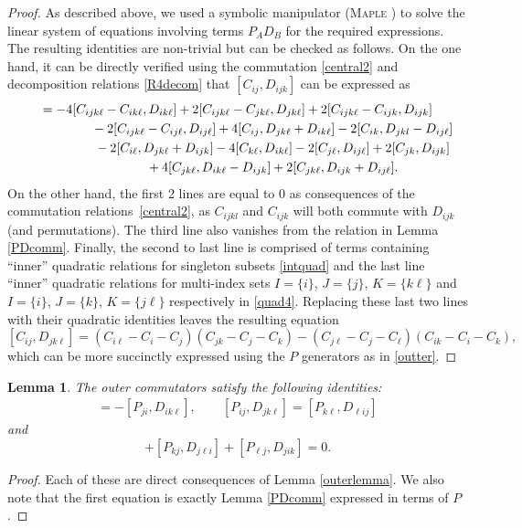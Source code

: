 \documentclass[pdftex]{sigma}
\numberwithin{equation}{section}
\newtheorem{Lemma}[Theorem]{Lemma}
\begin{document}
\begin{proof} As described above, we used a symbolic manipulator (\textsc{Maple} \cite{Maple}) to solve the linear system of equations involving terms $P_{A} D_B$ for the required expressions. The resulting identities are non-trivial but can be checked as follows. On the one hand, it can be directly verified using the commutation \eqref{central2} and decomposition relations \eqref{R4decom} that $[C_{ij}, D_{ijk}]$ can be expressed as
\begin{gather*}
[C_{ij},D_{jkl}]= - 4[C_{ijk\ell}-C_{ik\ell}, D_{ik\ell}]+2[C_{ijk\ell}-C_{jk\ell}, D_{jk\ell}]
+2[C_{ijk\ell}-C_{ijk}, D_{ijk}] \\
\hphantom{[C_{ij},D_{jkl}]=}{}- 2[C_{ijk\ell}-C_{ij\ell}, D_{ij\ell}]+4[C_{ij}, D_{jk\ell}+D_{ik\ell}]- 2[C_{ik},D_{jkl}-D_{ij\ell}]
\\
\hphantom{[C_{ij},D_{jkl}]=}{}- 2[C_{i\ell}, D_{jk\ell}+D_{ijk}]
-4 [C_{k\ell}, D_{ik\ell}]-2 [C_{j\ell}, D_{ij\ell}]
+2[C_{jk}, D_{ijk}]\\
\hphantom{[C_{ij},D_{jkl}]=}{}+4[C_{jk\ell}, D_{ik\ell}-D_{ijk}]+2[C_{jk\ell}, D_{ijk}+D_{ij\ell}].
\end{gather*}
 On the other hand, the first 2 lines are equal to 0 as consequences of the commutation relations~\eqref{central2}, as $C_{ijkl}$ and $C_{ijk}$ will both commute with $D_{ijk}$ (and permutations). The third line also vanishes from the relation in Lemma \ref{PDcomm}. Finally, the second to last line is comprised of terms containing ``inner'' quadratic relations for singleton subsets \eqref{intquad} and the last line ``inner'' quadratic relations for multi-index sets $I=\{i\}$, $J=\{j\}$, $K=\{k\ell\}$ and $I=\{i\}$, $J=\{k\}$, $ K=\{j\ell\}$ respectively in \eqref{quad4}. Replacing these last two lines with their quadratic identities leaves the resulting equation
 \[ [C_{ij}, D_{jk\ell}] =(C_{i\ell}- C_i -C_j) (C_{jk}-C_j-C_k)-(C_{j\ell}-C_j-C_{\ell})(C_{ik}-C_i-C_k),\]
which can be more succinctly expressed using the $P$ generators as in \eqref{outter}.
\end{proof}

\begin{Lemma} \label{allPDrel|}
The outer commutators satisfy the following identities:
\begin{gather*}
 [P_{ij}, D_{jk\ell}] =- [P_{ji} ,D_{ik\ell}],
\qquad
[P_{ij}, D_{jk\ell}]= [P_{k\ell}, D_{\ell ij}]
\end{gather*}
and
\begin{equation}
[P_{ij},D_{jk\ell}]+[P_{kj}, D_{j\ell i}]+[P_{\ell j}, D_{j ik}]=0. \label{switchPD}
\end{equation}
\end{Lemma}
\begin{proof}
 Each of these are direct consequences of Lemma \ref{outerlemma}. We also note that the first equation is exactly Lemma \ref{PDcomm} expressed in terms of $P$.
 \end{proof}
\end{document}
